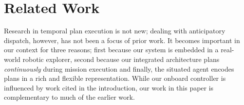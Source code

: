 \section{Related Work}
\label{sec:related}


Research in temporal plan execution is not new; dealing with
anticipatory dispatch, however, has not been a focus of prior work. It
becomes important in our context for three reasons; first because our
system is embedded in a real-world robotic explorer, second because
our integrated architecture \rx \cite{mcgann08bdup,py10dup,rajan12dup}
plans \emph{continuously} during mission execution and finally, the
situated agent encodes plans in a rich and flexible representation.
While our onboard controller is influenced by work cited in the
introduction, our work in this paper is complementary to much of the
earlier work.



